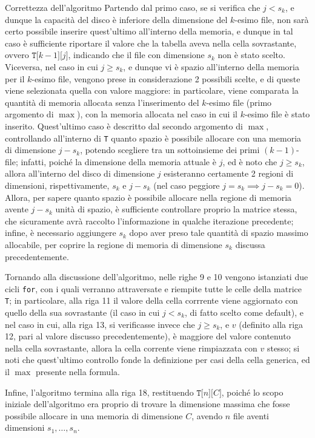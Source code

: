 \documentclass[a4paper, 12pt]{report}
\begin{document}
\begin{framedobs}{Correttezza dell'algoritmo}
        Partendo dal primo caso, se si verifica che $j < s_k$, e dunque la capacità del disco è inferiore della dimensione del $k$-esimo file, non sarà certo possibile inserire quest'ultimo all'interno della memoria, e dunque in tal caso è sufficiente riportare il valore che la tabella aveva nella cella sovrastante, ovvero $\texttt{T[}k-1\texttt{][}j\texttt{]}$, indicando che il file con dimensione $s_k$ non è stato scelto. Viceversa, nel caso in cui $j \ge s_k$, e dunque vi è spazio all'interno della memoria per il $k$-esimo file, vengono prese in considerazione 2 possibili scelte, e di queste viene selezionata quella con valore maggiore: in particolare, viene comparata la quantità di memoria allocata senza l'inserimento del $k$-esimo file (primo argomento di $\max$), con la memoria allocata nel caso in cui il $k$-esimo file è stato inserito. Quest'ultimo caso è descritto dal secondo argomento di $\max$, controllando all'interno di \texttt{T} quanto spazio è possibile allocare con una memoria di dimensione $j - s_k$, potendo scegliere tra un sottoinsieme dei primi $(k - 1)$-file; infatti, poiché la dimensione della memoria attuale è $j$, ed è noto che $j \ge s_k$, allora all'interno del disco di dimensione $j$ esisteranno certamente 2 regioni di dimensioni, rispettivamente, $s_k$ e $j - s_k$ (nel caso peggiore $j = s_k \implies j - s_k = 0$). Allora, per sapere quanto spazio è possibile allocare nella regione di memoria avente $j - s_k$ unità di spazio, è sufficiente controllare proprio la matrice stessa, che sicuramente avrà raccolto l'informazione in qualche iterazione precedente; infine, è necessario aggiungere $s_k$ dopo aver preso tale quantità di spazio massimo allocabile, per coprire la regione di memoria di dimensione $s_k$ discussa precedentemente.

        Tornando alla discussione dell'algoritmo, nelle righe 9 e 10 vengono istanziati due cicli \texttt{for}, con i quali verranno attraversate e riempite tutte le celle della matrice \texttt{T}; in particolare, alla riga 11 il valore della cella corrrente viene aggiornato con quello della sua sovrastante (il caso in cui $j < s_k$, di fatto scelto come default), e nel caso in cui, alla riga 13, si verificasse invece che $j \ge s_k$, e $v$ (definito alla riga 12, pari al valore discusso precedentemente), è maggiore del valore contenuto nella cella sovrastante, allora la cella corrente viene rimpiazzata con $v$ stesso; si noti che quest'ultimo controllo fonde la definizione per casi della cella generica, ed il $\max$ presente nella formula.

        Infine, l'algoritmo termina alla riga 18, restituendo $\texttt{T[}n\texttt{][}C\texttt{]}$, poiché lo scopo iniziale dell'algoritmo era proprio di trovare la dimensione massima che fosse possibile allocare in una memoria di dimensione $C$, avendo $n$ file aventi dimensioni $s_1, \ldots, s_n$.
    \end{framedobs}
\end{document}

